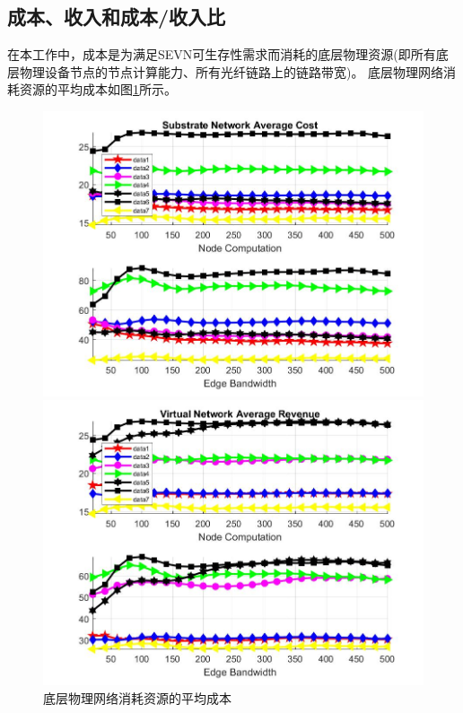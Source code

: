 \subsection{成本、收入和成本/收入比}
在本工作中，成本是为满足SEVN可生存性需求而消耗的底层物理资源(即所有底层物理设备节点的节点计算能力、所有光纤链路上的链路带宽)。
底层物理网络消耗资源的平均成本如图\ref{fig:CostAccumulateAverageSubstrateNetwork}所示。
\begin{figure}[htbp]
\centering
\begin{minipage}{0.4\textwidth}
\centering
\includegraphics[width=\textwidth]{figures/CostAccumulateAverageSubstrateNetwork}
\caption{底层物理网络消耗资源的平均成本}\label{fig:CostAccumulateAverageSubstrateNetwork}
\end{minipage}
\begin{minipage}{0.4\textwidth}
\centering
\includegraphics[width=\textwidth]{figures/RevenueAccumulateAverageVirtualNetwork}

\end{minipage}
\end{figure}
